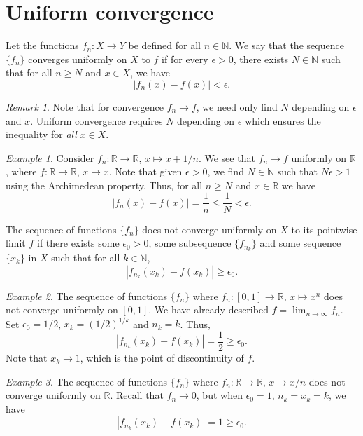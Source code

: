 \documentclass[11pt]{article}
\def\R{\mathbb{R}}
\def\N{\mathbb{N}}
\theoremstyle{definition}
\theoremstyle{remark}
\newtheorem*{remark}{Remark}
\newtheorem*{example}{Example}
\numberwithin{equation}{module}
\begin{document}
    \newpage
    \section*{Uniform convergence}
    \begin{definition}
        Let the functions $f_n\colon X \to Y$ be defined for all $n \in \N$.
        We say that the sequence $\{f_n\}$ converges uniformly on $X$ to $f$ if
        for every $\epsilon > 0$, there exists $N \in \N$ such that for all $n \geq
        N$ and $x \in X$, we have \[
            |f_n(x) - f(x)| < \epsilon.
        \] 
        \begin{remark}
            Note that for convergence $f_n \to f$, we need only find $N$
            depending on $\epsilon$ and $x$. Uniform convergence requires $N$
            depending on $\epsilon$ which ensures the inequality for \emph{all} 
            $x \in X$.
        \end{remark}
    \end{definition}
    \begin{example}
        Consider $f_n\colon \R \to \R$, $x \mapsto x + 1 /n$. We see that $f_n \to
        f$ uniformly on $\R$, where $f\colon \R \to \R$, $x \mapsto x$.
        Note that given $\epsilon > 0$, we find $N \in \N$ such that $N\epsilon >
        1$ using the Archimedean property. Thus, for all $n \geq N$ and $x \in \R$
        we have \[
            |f_n(x) - f(x)| = \frac{1}{n} \leq \frac{1}{N} < \epsilon.
        \] 
    \end{example}

    \begin{lemma}
        The sequence of functions $\{f_n\}$ does not converge uniformly on $X$ to
        its pointwise limit $f$ if there exists some $\epsilon_0 > 0$, some
        subsequence $\{f_{n_k}\}$ and some sequence $\{x_k\}$ in $X$ such that for
        all $k \in \N$, \[
            |f_{n_k}(x_k) - f(x_k)| \geq \epsilon_0.
        \] 
    \end{lemma}
    \begin{example}
        The sequence of functions $\{f_n\}$ where $f_n\colon [0, 1] \to \R$, $x
        \mapsto x^n$ does not converge uniformly on $[0, 1]$.
        We have already described $f = \lim_{n \to \infty} f_n$.
        Set $\epsilon_0 = 1 /2$, $x_k = (1 /2)^{1 /k}$ and $n_k = k$. Thus, \[
            |f_{n_k}(x_k) - f(x_k)| = \frac{1}{2} \geq \epsilon_0.
        \]
        Note that $x_k \to 1$, which is the point of discontinuity of $f$.
    \end{example}
    \begin{example}
        The sequence of functions $\{f_n\}$ where $f_n\colon \R \to \R$, $x \mapsto
        x /n$ does not converge uniformly on $\R$.
        Recall that $f_n \to 0$, but when $\epsilon_0 = 1$, $n_k = x_k = k$, we have
        \[
            |f_{n_k}(x_k) - f(x_k)| = 1 \geq \epsilon_0.
        \] 
    \end{example}
\end{document}
